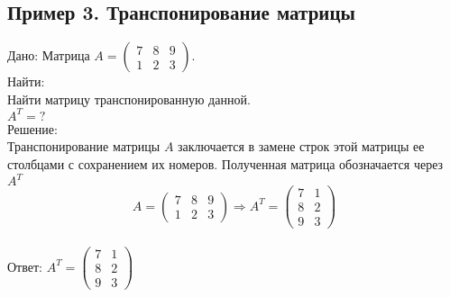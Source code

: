 \documentclass[a4paper,12pt]{article} %
\begin{document}
\begin{flushleft}
\section*{Пример 3. Транспонирование матрицы}
Дано: Матрица
$ A=\begin{pmatrix}
7 & 8 & 9 \\
1 & 2 & 3
\end{pmatrix} $. \\
Найти:\\
Найти матрицу транспонированную данной.\\
$A^T=?$\\
Решение:\\
Транспонирование матрицы $A$ заключается в замене строк этой матрицы ее столбцами с сохранением их номеров. Полученная матрица обозначается через $A^T$\\
$$ A=\begin{pmatrix}
7 & 8 & 9 \\
1 & 2 & 3
\end{pmatrix} \Rightarrow A^T=\begin{pmatrix}
7 & 1 \\
8 & 2 \\
9 & 3
\end{pmatrix}$$\\
Ответ: $ A^T=\begin{pmatrix}
7 & 1 \\
8 & 2 \\
9 & 3
\end{pmatrix}$


\end{flushleft}
\end{document}
